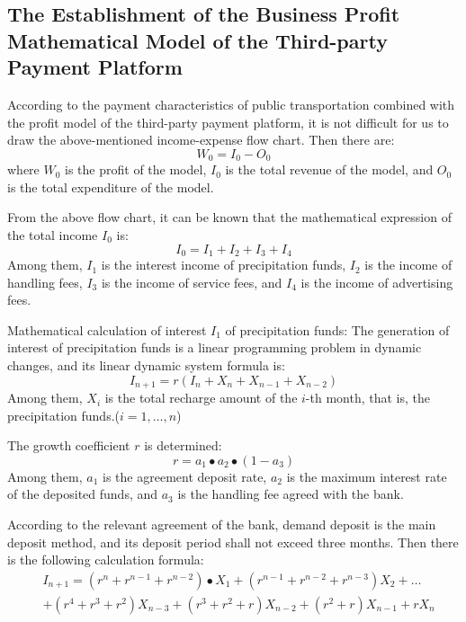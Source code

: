 \documentclass[../mcmpaper]{subfiles}
\begin{document}
\subsection{The Establishment of the Business Profit Mathematical Model of the Third-party Payment Platform}
According to the payment characteristics of public transportation combined with the profit model of the third-party payment platform, it is not difficult for us to draw the above-mentioned income-expense flow chart. Then there are:
\begin{equation}
W_0 = I_0 - O_0
\end{equation}
where $W_0$ is the profit of the model, $I_0$ is the total revenue of the model, and $O_0$ is the total expenditure of the model.
\par
From the above flow chart, it can be known that the mathematical expression of the total income $I_0$ is:
\begin{equation}
I_0 = I_1 + I_2 + I_3 + I_4
\end{equation}
Among them, $I_1$ is the interest income of precipitation funds, $I_2$ is the income of handling fees, $I_3$ is the income of service fees, and $I_4$ is the income of advertising fees.
\par
Mathematical calculation of interest $I_1$ of precipitation funds: The generation of interest of precipitation funds is a linear programming problem in dynamic changes, and its linear dynamic system formula is:
\begin{equation}
I_{n+1} = r(I_n+X_n+X_{n-1}+X_{n-2})
\end{equation}
Among them, $X_i$ is the total recharge amount of the $i$-th month, that is, the precipitation funds.($i=1,\dots,n$)
\par
The growth coefficient $r$ is determined:
\begin{equation}
r = a_1\bullet a_2\bullet(1-a_3)
\end{equation}
Among them, $a_1$ is the agreement deposit rate, $a_2$ is the maximum interest rate of the deposited funds, and $a_3$ is the handling fee agreed with the bank.
\par
According to the relevant agreement of the bank, demand deposit is the main deposit method, and its deposit period shall not exceed three months. Then there is the following calculation formula:
\begin{equation}
\begin{aligned}
&I_{n+1}=\left(r^{n}+r^{n-1}+r^{n-2}\right) \bullet X_{1}+\left(r^{n-1}+r^{n-2}+r^{n-3}\right) X_{2}+\dots \\
&+\left(r^{4}+r^{3}+r^{2}\right) X_{n-3}+\left(r^{3}+r^{2}+r\right) X_{n-2}+\left(r^{2}+r\right) X_{n-1}+r X_{n}
\end{aligned}
\end{equation}
\end{document}
